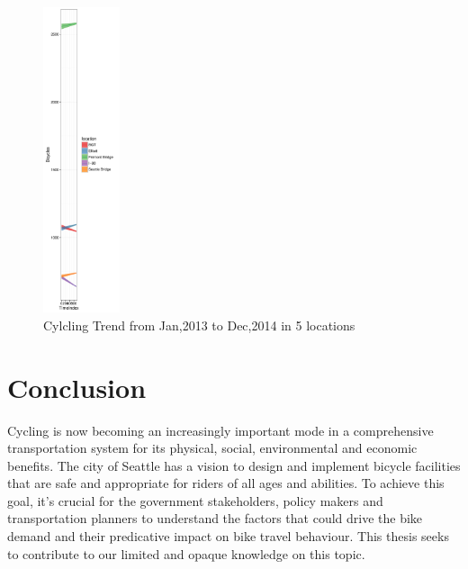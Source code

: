 \documentclass [11pt, proquest] {uwthesis}[2015/03/03]
\begin{document}
\begin{figure}
  \includegraphics[width=0.2\textwidth]{figures/5sites/Sim_trend} 
 \caption{Cylcling Trend from Jan,2013 to Dec,2014 in 5 locations }
 \label{fig:Sim_trend}
\end{figure}


\chapter{Conclusion}

Cycling is now becoming an increasingly important mode in a comprehensive transportation system for its physical, social, environmental and economic benefits. The city of Seattle has a vision to design and implement bicycle facilities that are safe and appropriate for riders of all ages and abilities. To achieve this goal, it's crucial for the government stakeholders, policy makers and transportation planners to understand the factors that could drive the bike demand and their predicative impact on bike travel behaviour. This thesis seeks to contribute to our limited and opaque knowledge on this topic.
\end{document}
